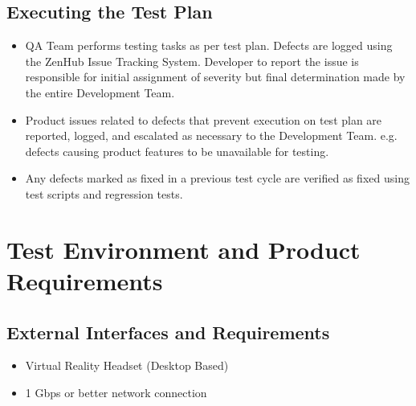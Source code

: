 \documentclass[letterpaper,10pt,english]{sphinxmanual}
\begin{document}
\subsection{Executing the Test Plan}
\label{\detokenize{test_plan/test_management:executing-the-test-plan}}\begin{itemize}
\item {} 
QA Team performs testing tasks as per test plan. Defects are logged using the ZenHub Issue Tracking System. Developer to report the issue is responsible for initial assignment of severity but final determination made by the entire Development Team.

\item {} 
Product issues related to defects that prevent execution on test plan are reported, logged, and escalated as necessary to the Development Team. e.g. defects causing product features to be unavailable for testing.

\item {} 
Any defects marked as fixed in a previous test cycle are verified as fixed using test scripts and regression tests.

\end{itemize}


\section{Test Environment and Product Requirements}
\label{\detokenize{test_plan/test_environment_and_product_requirements:test-environment-and-product-requirements}}\label{\detokenize{test_plan/test_environment_and_product_requirements::doc}}

\subsection{External Interfaces and Requirements}
\label{\detokenize{test_plan/test_environment_and_product_requirements:external-interfaces-and-requirements}}\begin{itemize}
\item {} 
Virtual Reality Headset (Desktop Based)

\item {} 
1 Gbps or better network connection

\end{itemize}
\end{document}
